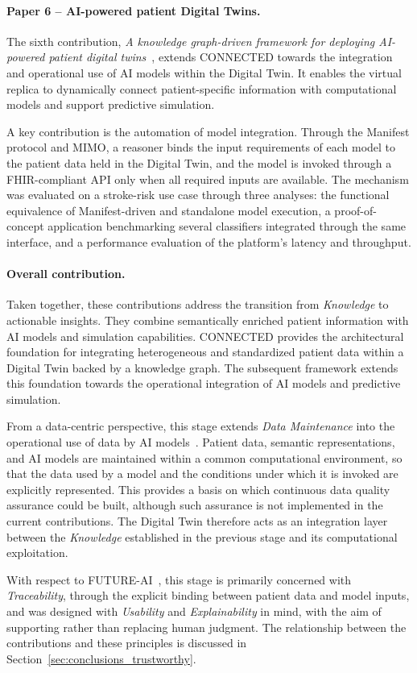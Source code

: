 \paragraph{Paper 6 -- AI-powered patient Digital Twins.}
The sixth contribution, \emph{A knowledge graph-driven framework for deploying AI-powered patient digital twins}~\cite{MARFOGLIA2026108380}, extends CONNECTED towards the integration and operational use of AI models within the Digital Twin. It enables the virtual replica to dynamically connect patient-specific information with computational models and support predictive simulation.

A key contribution is the automation of model integration. Through the Manifest protocol and MIMO, a reasoner binds the input requirements of each model to the patient data held in the Digital Twin, and the model is invoked through a FHIR-compliant API only when all required inputs are available. The mechanism was evaluated on a stroke-risk use case through three analyses: the functional equivalence of Manifest-driven and standalone model execution, a proof-of-concept application benchmarking several classifiers integrated through the same interface, and a performance evaluation of the platform's latency and throughput.

\paragraph{Overall contribution.}
Taken together, these contributions address the transition from \emph{Knowledge} to actionable insights. They combine semantically enriched patient information with AI models and simulation capabilities. CONNECTED provides the architectural foundation for integrating heterogeneous and standardized patient data within a Digital Twin backed by a knowledge graph. The subsequent framework extends this foundation towards the operational integration of AI models and predictive simulation.

From a data-centric perspective, this stage extends \emph{Data Maintenance} into the operational use of data by AI models~\cite{zha_data-centric_2025}. Patient data, semantic representations, and AI models are maintained within a common computational environment, so that the data used by a model and the conditions under which it is invoked are explicitly represented. This provides a basis on which continuous data quality assurance could be built, although such assurance is not implemented in the current contributions. The Digital Twin therefore acts as an integration layer between the \emph{Knowledge} established in the previous stage and its computational exploitation.

With respect to FUTURE-AI~\cite{lekadir_future-ai_2025}, this stage is primarily concerned with \emph{Traceability}, through the explicit binding between patient data and model inputs, and was designed with \emph{Usability} and \emph{Explainability} in mind, with the aim of supporting rather than replacing human judgment. The relationship between the contributions and these principles is discussed in Section~\ref{sec:conclusions_trustworthy}.

